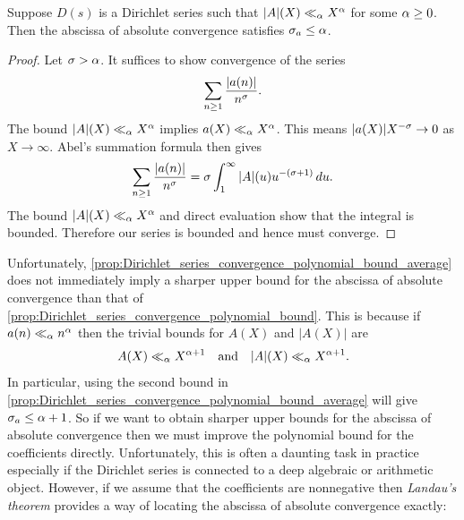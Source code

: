 \documentclass[12pt]{article}
\begin{document}
    \begin{proposition}\label{prop:Dirichlet_series_convergence_polynomial_bound_average}
      Suppose \(D(s)\) is a Dirichlet series such that \(|A|(X) \ll_{\alpha} X^{\alpha}\) for some \(\alpha \ge 0\). Then the abscissa of absolute convergence satisfies \(\sigma_{a} \le \alpha\).
    \end{proposition}
    \begin{proof}
      Let \(\sigma > \alpha\). It suffices to show convergence of the series
      \[
        \sum_{n \ge 1}\frac{|a(n)|}{n^{\sigma}}.
      \]
      The bound \(|A|(X) \ll_{\alpha} X^{\alpha}\) implies \(a(X) \ll_{\alpha} X^{\alpha}\). This means \(|a(X)|X^{-\sigma} \to 0\) as \(X \to \infty\). Abel's summation formula then gives
      \[
        \sum_{n \ge 1}\frac{|a(n)|}{n^{\sigma}} = \sigma\int_{1}^{\infty}|A|(u)u^{-(\sigma+1)}\,du.
      \]
      The bound \(|A|(X) \ll_{\alpha} X^{\alpha}\) and direct evaluation show that the integral is bounded. Therefore our series is bounded and hence must converge.
    \end{proof}

    Unfortunately, \cref{prop:Dirichlet_series_convergence_polynomial_bound_average} does not immediately imply a sharper upper bound for the abscissa of absolute convergence than that of \cref{prop:Dirichlet_series_convergence_polynomial_bound}. This is because if \(a(n) \ll_{\alpha} n^{\alpha}\) then the trivial bounds for \(A(X)\) and \(|A(X)|\) are
    \[
      A(X) \ll_{\alpha} X^{\alpha+1} \quad \text{and} \quad |A|(X) \ll_{\alpha} X^{\alpha+1}.
    \]
    In particular, using the second bound in \cref{prop:Dirichlet_series_convergence_polynomial_bound_average} will give \(\sigma_{a} \le \alpha+1\). So if we want to obtain sharper upper bounds for the abscissa of absolute convergence then we must improve the polynomial bound for the coefficients directly. Unfortunately, this is often a daunting task in practice especially if the Dirichlet series is connected to a deep algebraic or arithmetic object. However, if we assume that the coefficients are nonnegative then \textit{Landau's theorem} provides a way of locating the abscissa of absolute convergence exactly:
\end{document}
